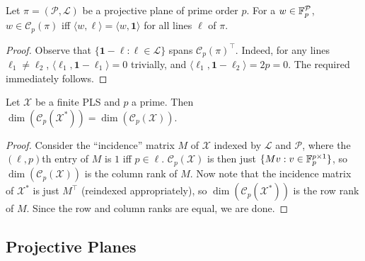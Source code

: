 	\begin{lemma}
		\label{lem: 1.2}
		Let $\pi = (\mathcal{P},\mathcal{L})$ be a projective plane of prime order $p$. For a $w \in \mathbb{F}_p^{\mathcal{P}}$, $w \in \mathcal{C}_p(\pi)$ iff $\langle w,\ell \rangle = \langle w, \textbf{1} \rangle$ for all lines $\ell$ of $\pi$.
	\end{lemma}
	\begin{proof}
		Observe that $\{ \textbf{1} - \ell : \ell \in \mathcal{L} \}$ spans $\mathcal{C}_p(\pi)^\top$. Indeed, for any lines $\ell_1 \ne \ell_2$, $\langle \ell_1, \textbf{1} - \ell_1 \rangle = 0$ trivially, and $\langle \ell_1, \textbf{1} - \ell_2 \rangle = 2p = 0$. The required immediately follows.
	\end{proof}

	\begin{lemma}
		Let $\mathcal{X}$ be a finite PLS and $p$ a prime. Then $\dim(\mathcal{C}_p(\mathcal{X}^*)) = \dim(\mathcal{C}_p(\mathcal{X}))$.
	\end{lemma}
	\begin{proof}
		Consider the ``incidence'' matrix $M$ of $\mathcal{X}$ indexed by $\mathcal{L}$ and $\mathcal{P}$, where the $(\ell,p)$th entry of $M$ is $1$ iff $p \in \ell$. $\mathcal{C}_p(\mathcal{X})$ is then just $\{Mv : v \in \mathbb{F}_p^{p \times 1}\}$, so $\dim(\mathcal{C}_p(\mathcal{X}))$ is the column rank of $M$. Now note that the incidence matrix of $\mathcal{X}^*$ is just $M^\top$ (reindexed appropriately), so $\dim(\mathcal{C}_p(\mathcal{X}^*))$ is the row rank of $M$. Since the row and column ranks are equal, we are done.
	\end{proof}

\subsection{Projective Planes}

